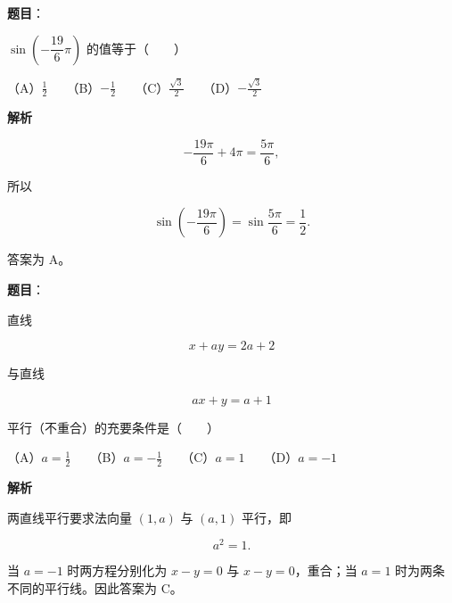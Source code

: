 \begin{answer}

\textbf{题目}：

$\sin\left(-\dfrac{19}{6}\pi\right)$ 的值等于\mbox{（　　）}

（A）$\frac12$　　（B）$-\frac12$　　（C）$\frac{\sqrt3}{2}$　　（D）$-\frac{\sqrt3}{2}$

\textbf{解析}

\nopagebreak[4]
\[
-\frac{19\pi}{6}+4\pi=\frac{5\pi}{6},
\]

所以

\nopagebreak[4]
\[
\sin\left(-\frac{19\pi}{6}\right)=\sin\frac{5\pi}{6}=\frac12.
\]

答案为 A。


\end{answer}
\begin{answer}

\textbf{题目}：

直线

\nopagebreak[4]
\[
x+ay=2a+2
\]

与直线

\nopagebreak[4]
\[
ax+y=a+1
\]

平行（不重合）的充要条件是\mbox{（　　）}

（A）$a=\frac12$　　（B）$a=-\frac12$　　（C）$a=1$　　（D）$a=-1$

\textbf{解析}

两直线平行要求法向量 $(1,a)$ 与 $(a,1)$ 平行，即

\nopagebreak[4]
\[
a^2=1.
\]

当 $a=-1$ 时两方程分别化为 $x-y=0$ 与 $x-y=0$，重合；当 $a=1$ 时为两条不同的平行线。因此答案为 C。


\end{answer}
